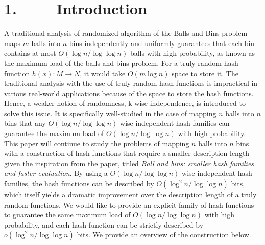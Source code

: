 \documentclass[a4paper, english]{paper}
\begin{document}
	\section{1. $\qquad$ Introduction}
	\qquad A traditional analysis of randomized algorithm of the Balls and Bins problem maps $m$ balls into $n$ bins independently and uniformly guarantees that each bin contains at most $O(\log n/\log\log n)$ balls with high probability, as known as the maximum load of the balls and bins problem. For a truly random hash function $h(x): M \rightarrow N$, it would take $O(m\log n)$ space to store it. The traditional analysis with the use of truly random hash functions is impractical in various real-world applications because of the space to store the hash functions. Hence, a weaker notion of randomness, k-wise independence, is introduced to solve this issue. It is specifically well-studied in the case of mapping $n$ balls into $n$ bins that any $O(\log n/\log\log n)$-wise independent hash families can guarantee the maximum load of $O(\log n/\log\log n)$ with high probability. \\
	\indent This paper will continue to study the problems of mapping $n$ balls into $n$ bins with a construction of hash functions that require a smaller description length given the inspiration from the paper, titled \textit{Ball and bins: smaller hash families and faster evaluation}. By using a $O(\log n/\log\log n)$-wise independent hash families, the hash functions can be described by $O(\log^2 n/\log\log n)$ bits, which itself yields a dramatic improvement over the description length of a truly random functions. We would like to provide an explicit family of hash functions to guarantee the same maximum load of $O(\log n/\log\log n)$ with high probability, and each hash function can be strictly described by $o(\log^2 n/\log\log n)$ bits. We provide an overview of the construction below.   \\
	
\end{document}
